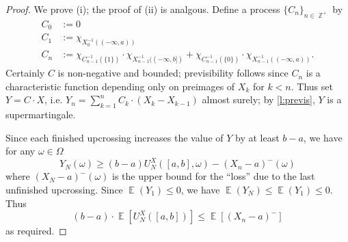 \documentclass[11pt, a4paper]{memoir}
\DeclareMathOperator{\Z}{{\mathbb{Z}}}
\theoremstyle{change}
\theoremstyle{plain}
\theoremstyle{nonumberplain}
\newtheorem{proof}{Proof}
\DeclareMathOperator{\E}{{\mathbb{E}}}
\numberwithin{equation}{section}
\begin{document}
\begin{proof}
    We prove (i); the proof of (ii) is analgous.
    Define a process $\{C_n\}_{n\in\Z^+}$ by
    \begin{align*}
        C_0&:= 0\\
        C_1&:=\chi_{X_0^{-1}((-\infty,a))}\\
        C_n&:=\chi_{C_{n-1}^{-1}(\{1\})}\cdot\chi_{X_{n-1}^{-1}((-\infty,b])}+\chi_{C_{n-1}^{-1}(\{0\})}\cdot\chi_{X_{n-1}^{-1}((-\infty,a))}.
    \end{align*}
    Certainly $C$ is non-negative and bounded; previsibility follows since $C_n$ is a characteristic function depending only on preimages of $X_k$ for $k<n$.
    Thus set $Y=C\cdot X$, i.e. $Y_n=\sum_{k=1}^n C_k\cdot(X_k-X_{k-1})$ almost surely; by \cref{l:previs}, $Y$ is a supermartingale.

    Since each finished upcrossing increases the value of $Y$ by at least $b-a$, we have for any $\omega\in\Omega$
    \begin{equation*}
        Y_N(\omega)\geq(b-a)U_N^X([a,b],\omega)-(X_n-a)^-(\omega)
    \end{equation*}
    where $(X_N-a)^-(\omega)$ is the upper bound for the ``loss'' due to the last unfinished upcrossing.
    Since $\E(Y_1)\leq 0$, we have $\E(Y_N)\leq\E(Y_1)\leq 0$.
    Thus
    \begin{equation*}
        (b-a)\cdot\E[U_N^X([a,b])]\leq\E[(X_n-a)^-]
    \end{equation*}
    as required.
\end{proof}
\end{document}

